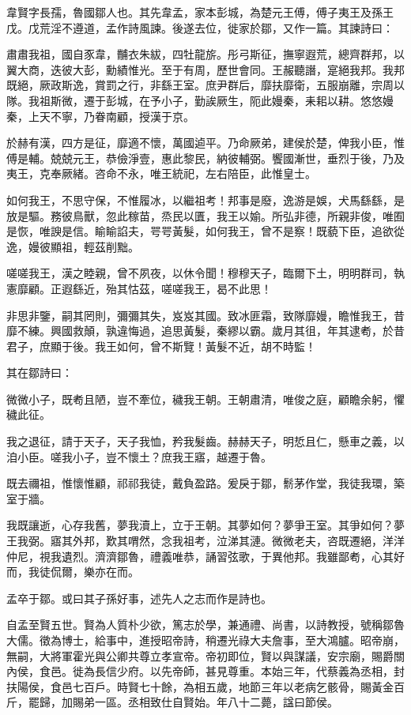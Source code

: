 
\begin{pinyinscope}
韋賢字長孺，魯國鄒人也。其先韋孟，家本彭城，為楚元王傅，傅子夷王及孫王戊。戊荒淫不遵道，孟作詩風諫。後遂去位，徙家於鄒，又作一篇。其諫詩曰：

肅肅我祖，國自豕韋，黼衣朱紱，四牡龍旂。彤弓斯征，撫寧遐荒，總齊群邦，以翼大商，迭彼大彭，勳績惟光。至于有周，歷世會同。王赧聽譖，寔絕我邦。我邦既絕，厥政斯逸，賞罰之行，非繇王室。庶尹群后，靡扶靡衛，五服崩離，宗周以隊。我祖斯微，遷于彭城，在予小子，勤誒厥生，阨此嫚秦，耒耜以耕。悠悠嫚秦，上天不寧，乃眷南顧，授漢于京。

於赫有漢，四方是征，靡適不懷，萬國逌平。乃命厥弟，建侯於楚，俾我小臣，惟傅是輔。兢兢元王，恭儉淨壹，惠此黎民，納彼輔弼。饗國漸世，垂烈于後，乃及夷王，克奉厥緒。咨命不永，唯王統祀，左右陪臣，此惟皇士。

如何我王，不思守保，不惟履冰，以繼祖考！邦事是廢，逸游是娛，犬馬繇繇，是放是驅。務彼鳥獸，忽此稼苗，烝民以匱，我王以媮。所弘非德，所親非俊，唯囿是恢，唯諛是信。睮睮諂夫，咢咢黃髮，如何我王，曾不是察！既藐下臣，追欲從逸，嫚彼顯祖，輕茲削黜。

嗟嗟我王，漢之睦親，曾不夙夜，以休令聞！穆穆天子，臨爾下土，明明群司，執憲靡顧。正遐繇近，殆其怙茲，嗟嗟我王，曷不此思！

非思非鑒，嗣其罔則，彌彌其失，岌岌其國。致冰匪霜，致隊靡嫚，瞻惟我王，昔靡不練。興國救顛，孰違悔過，追思黃髮，秦繆以霸。歲月其徂，年其逮耇，於昔君子，庶顯于後。我王如何，曾不斯覽！黃髮不近，胡不時監！

其在鄒詩曰：

微微小子，既耇且陋，豈不牽位，穢我王朝。王朝肅清，唯俊之庭，顧瞻余躬，懼穢此征。

我之退征，請于天子，天子我恤，矜我髮齒。赫赫天子，明悊且仁，懸車之義，以洎小臣。嗟我小子，豈不懷土？庶我王寤，越遷于魯。

既去禰祖，惟懷惟顧，祁祁我徒，戴負盈路。爰戾于鄒，鬋茅作堂，我徒我環，築室于牆。

我既讓逝，心存我舊，夢我瀆上，立于王朝。其夢如何？夢爭王室。其爭如何？夢王我弼。寤其外邦，歎其喟然，念我祖考，泣涕其漣。微微老夫，咨既遷絕，洋洋仲尼，視我遺烈。濟濟鄒魯，禮義唯恭，誦習弦歌，于異他邦。我雖鄙耇，心其好而，我徒侃爾，樂亦在而。

孟卒于鄒。或曰其子孫好事，述先人之志而作是詩也。

自孟至賢五世。賢為人質朴少欲，篤志於學，兼通禮、尚書，以詩教授，號稱鄒魯大儒。徵為博士，給事中，進授昭帝詩，稍遷光祿大夫詹事，至大鴻臚。昭帝崩，無嗣，大將軍霍光與公卿共尊立孝宣帝。帝初即位，賢以與謀議，安宗廟，賜爵關內侯，食邑。徙為長信少府。以先帝師，甚見尊重。本始三年，代蔡義為丞相，封扶陽侯，食邑七百戶。時賢七十餘，為相五歲，地節三年以老病乞骸骨，賜黃金百斤，罷歸，加賜弟一區。丞相致仕自賢始。年八十二薨，諡曰節侯。


\end{pinyinscope}
